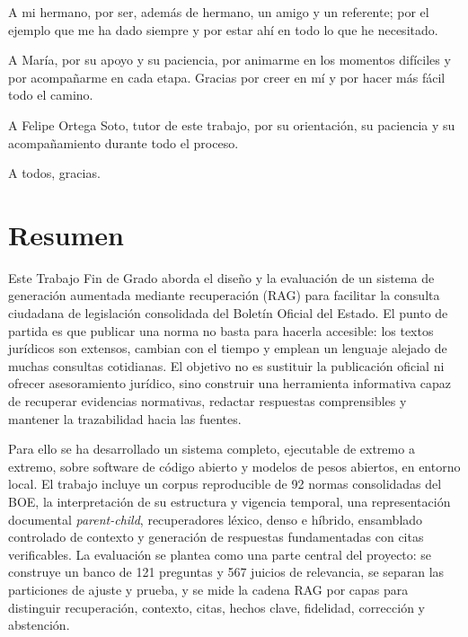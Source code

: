 \documentclass[
paper=a4,
fontsize=12pt,
twoside,
openright,                  %
titlepage,                  %
headsepline,                %
footheight=16pt,            %
parskip=half+,				%
numbers=noenddot,			%
headinclude=true,           %
footinclude=true,           %
cleardoublepage=empty,      %
captions=tableheading,      %
BCOR=5mm, 				    %
DIV=9   			        %
usegeometry=true			%
]{scrbook}
\begin{document}
A mi hermano, por ser, además de hermano, un amigo y un referente; por el ejemplo que me ha dado siempre y por estar ahí en todo lo que he necesitado.

A María, por su apoyo y su paciencia, por animarme en los momentos difíciles y por acompañarme en cada etapa. Gracias por creer en mí y por hacer más fácil todo el camino.

A Felipe Ortega Soto, tutor de este trabajo, por su orientación, su paciencia y su acompañamiento durante todo el proceso.

A todos, gracias.


\chapter*{Resumen}

Este Trabajo Fin de Grado aborda el diseño y la evaluación de un sistema de generación aumentada mediante recuperación (RAG) para facilitar la consulta ciudadana de legislación consolidada del Boletín Oficial del Estado. El punto de partida es que publicar una norma no basta para hacerla accesible: los textos jurídicos son extensos, cambian con el tiempo y emplean un lenguaje alejado de muchas consultas cotidianas. El objetivo no es sustituir la publicación oficial ni ofrecer asesoramiento jurídico, sino construir una herramienta informativa capaz de recuperar evidencias normativas, redactar respuestas comprensibles y mantener la trazabilidad hacia las fuentes.

Para ello se ha desarrollado un sistema completo, ejecutable de extremo a extremo, sobre software de código abierto y modelos de pesos abiertos, en entorno local. El trabajo incluye un corpus reproducible de 92 normas consolidadas del BOE, la interpretación de su estructura y vigencia temporal, una representación documental \emph{parent-child}, recuperadores léxico, denso e híbrido, ensamblado controlado de contexto y generación de respuestas fundamentadas con citas verificables. La evaluación se plantea como una parte central del proyecto: se construye un banco de 121 preguntas y 567 juicios de relevancia, se separan las particiones de ajuste y prueba, y se mide la cadena RAG por capas para distinguir recuperación, contexto, citas, hechos clave, fidelidad, corrección y abstención.
\end{document}
